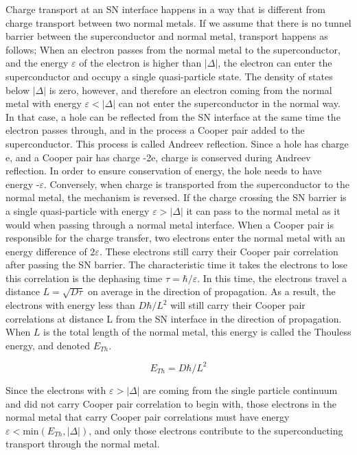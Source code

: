 Charge transport at an SN interface happens in a way that is different from charge transport between two normal metals. If we assume that there is no tunnel barrier between the superconductor and normal metal, transport happens as follows; When an electron passes from the normal metal to the superconductor, and the energy $\varepsilon$ of the electron is higher than $|\Delta|$, the electron can enter the superconductor and occupy a single quasi-particle state. The density of states below $|\Delta|$ is zero, however, and therefore an electron coming from the normal metal with energy $\varepsilon < |\Delta|$ can not enter the superconductor in the normal way. In that case, a hole can be reflected from the SN interface at the same time the electron passes through, and in the process a Cooper pair added to the superconductor. This process is called Andreev reflection. Since a hole has charge e, and a Cooper pair has charge -2e, charge is conserved during Andreev reflection. In order to ensure conservation of energy, the hole needs to have energy -$\varepsilon$. Conversely, when charge is transported from the superconductor to the normal metal, the mechanism is reversed. If the charge crossing the SN barrier is a single quasi-particle with energy $\varepsilon > |\Delta|$ it can pass to the normal metal as it would when passing through a normal metal interface. When a Cooper pair is responsible for the charge transfer, two electrons enter the normal metal with an energy difference of $2\varepsilon$. These electrons still carry their Cooper pair correlation after passing the SN barrier. The characteristic time it takes the electrons to lose this correlation is the dephasing time $\tau = \hbar/\varepsilon$. In this time, the electrons travel a distance $L = \sqrt{D\tau}$ on average in the direction of propagation. As a result, the electrons with energy less than $D\hbar/L^2$ will still carry their Cooper pair correlations at distance L from the SN interface in the direction of propagation. When $L$ is the total length of the normal metal, this energy is called the Thouless energy, and denoted $E_{Th}$.

\begin{equation}
\label{eq:E_Th(D,L)}
E_{Th} = D\hbar/L^2
\end{equation}



 Since the electrons with $\varepsilon > |\Delta|$ are coming from the single particle continuum and did not carry Cooper pair correlation to begin with, those electrons in the normal metal that carry Cooper pair correlations must have energy $\varepsilon < \mathrm{min}\left(E_{Th}, |\Delta|\right)$, and only those electrons contribute to the superconducting transport through the normal metal.


